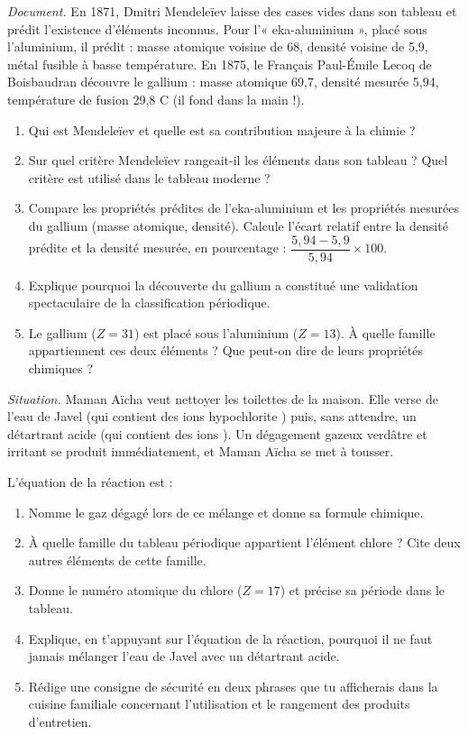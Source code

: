 \documentclass[11pt]{article}
\begin{document}
\begin{exercice}
\textit{Document.} En 1871, Dmitri Mendeleïev laisse des cases vides dans son tableau et prédit l'existence d'éléments inconnus. Pour l'« eka-aluminium », placé sous l'aluminium, il prédit : masse atomique voisine de 68, densité voisine de 5,9, métal fusible à basse température. En 1875, le Français Paul-Émile Lecoq de Boisbaudran découvre le gallium  : masse atomique 69,7, densité mesurée 5,94, température de fusion 29,8 \degres C (il fond dans la main !).
\begin{enumerate}
\item Qui est Mendeleïev et quelle est sa contribution majeure à la chimie ?
\item Sur quel critère Mendeleïev rangeait-il les éléments dans son tableau ? Quel critère est utilisé dans le tableau moderne ?
\item Compare les propriétés prédites de l'eka-aluminium et les propriétés mesurées du gallium (masse atomique, densité). Calcule l'écart relatif entre la densité prédite et la densité mesurée, en pourcentage : $\dfrac{5,94 - 5,9}{5,94} \times 100$.
\item Explique pourquoi la découverte du gallium a constitué une validation spectaculaire de la classification périodique.
\item Le gallium  ($Z = 31$) est placé sous l'aluminium  ($Z = 13$). À quelle famille appartiennent ces deux éléments ? Que peut-on dire de leurs propriétés chimiques ?
\end{enumerate}
\end{exercice}

\begin{exercice}
\textit{Situation.} Maman Aïcha veut nettoyer les toilettes de la maison. Elle verse de l'eau de Javel (qui contient des ions hypochlorite ) puis, sans attendre, un détartrant acide (qui contient des ions ). Un dégagement gazeux verdâtre et irritant se produit immédiatement, et Maman Aïcha se met à tousser.

L'équation de la réaction est : 
\begin{enumerate}
\item Nomme le gaz dégagé lors de ce mélange et donne sa formule chimique.
\item À quelle famille du tableau périodique appartient l'élément chlore ? Cite deux autres éléments de cette famille.
\item Donne le numéro atomique du chlore ($Z = 17$) et précise sa période dans le tableau.
\item Explique, en t'appuyant sur l'équation de la réaction, pourquoi il ne faut jamais mélanger l'eau de Javel avec un détartrant acide.
\item Rédige une consigne de sécurité en deux phrases que tu afficherais dans la cuisine familiale concernant l'utilisation et le rangement des produits d'entretien.
\end{enumerate}
\end{exercice}
\end{document}
